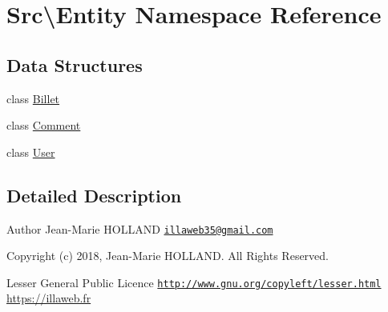 \hypertarget{namespace_src_1_1_entity}{}\section{Src\textbackslash{}Entity Namespace Reference}
\label{namespace_src_1_1_entity}
\subsection*{Data Structures}
\begin{DoxyCompactItemize}
\item 
class \hyperlink{class_src_1_1_entity_1_1_billet}{Billet}
\item 
class \hyperlink{class_src_1_1_entity_1_1_comment}{Comment}
\item 
class \hyperlink{class_src_1_1_entity_1_1_user}{User}
\end{DoxyCompactItemize}


\subsection{Detailed Description}
\begin{DoxyAuthor}{Author}
Jean-\/\+Marie H\+O\+L\+L\+A\+ND \href{mailto:illaweb35@gmail.com}{\tt illaweb35@gmail.\+com} 
\end{DoxyAuthor}
\begin{DoxyCopyright}{Copyright}
(c) 2018, Jean-\/\+Marie H\+O\+L\+L\+A\+ND. All Rights Reserved.
\end{DoxyCopyright}
Lesser General Public Licence \href{http://www.gnu.org/copyleft/lesser.html}{\tt http\+://www.\+gnu.\+org/copyleft/lesser.\+html} \hyperlink{}{https\+://illaweb.\+fr}